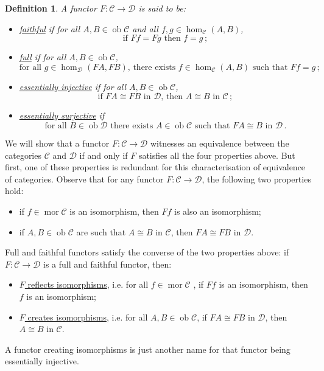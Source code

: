 \documentclass[a4paper,11pt]{article}
\theoremstyle{break_italics}
\newtheorem*{definition*}{Definition}
\theoremstyle{break_upright}
\theoremstyle{remark}
\newcommand{\ob}{\operatorname{ob}}
\newcommand{\mor}{\operatorname{mor}}
\newcommand{\C}{\mathcal{C}}
\newcommand{\D}{\mathcal{D}}
\begin{document}
\begin{definition*}
A functor $F \colon \C \to \D$ is said to be:
\begin{itemize}
	\item \uline{faithful} if for all $A,B \in \ob\C$ and all $f,g \in \hom_\C(A,B)$,
		\[
			\text{if } Ff = Fg \text{ then } f = g\,;
		\]
	\item \uline{full} if for all $A,B \in \ob\C$,
		\[
			\text{for all } g \in \hom_\D(FA,FB) \text{, there exists } f \in \hom_\C(A,B) \text{ such that } Ff = g\,;
		\]
	\item \uline{essentially injective} if for all $A,B \in \ob\C$,
		\[
			\text{if } FA \cong FB \text{ in } \D \text{, then } A \cong B \text{ in }\C\,;
		\]
	\item \uline{essentially surjective} if
		\[
			\text{for all } B \in \ob\D \text{ there exists } A \in \ob\C \text{ such that } FA \cong B \text{ in } \D\,.
		\]
\end{itemize}	
\end{definition*}

We will show that a functor $F \colon \C \to \D$ witnesses an equivalence between the categories $\C$ and $\D$ if and only if $F$ satisfies all the four properties above. But first, one of these properties is redundant for this characterisation of equivalence of categories. Observe that for any functor $F \colon \C \to \D$, the following two properties hold:
\begin{itemize}
	\item if $f \in \mor\C$ is an isomorphism, then $Ff$ is also an isomorphism;
	\item if $A, B \in \ob\C$ are such that $A \cong B$ in $\C$, then $FA \cong FB$ in $\D$.
\end{itemize}
Full and faithful functors satisfy the converse of the two properties above: if $F \colon \C \to \D$ is a full and faithful functor, then:
\begin{itemize}
	\item \uline{$F$ reflects isomorphisms}, i.e. for all $f \in \mor\C$	, if $Ff$ is an isomorphism, then $f$ is an isomorphism;
	\item \uline{$F$ creates isomorphisms}, i.e. for all $A,B \in \ob\C$, if $FA \cong FB$ in $\D$, then $A \cong B$ in $\C$.
\end{itemize}
A functor creating isomorphisms is just another name for that functor being essentially injective.
\end{document}
